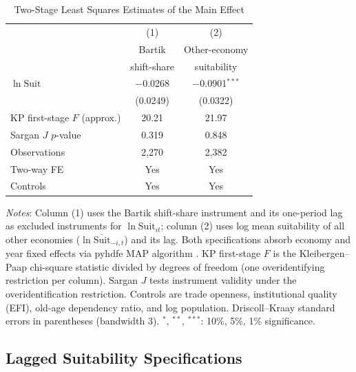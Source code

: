 \documentclass[12pt]{article}
\newcommand{\suit}{\mathrm{Suit}}
\begin{document}
\begin{table}[H]
\centering
\begin{threeparttable}
\caption{Two-Stage Least Squares Estimates of the Main Effect}
\label{tab:iv}
\small
\begin{tabular}{l*{2}{c}}
\toprule
 & (1) & (2) \\
 & Bartik & Other-economy \\
 & shift-share & suitability \\
\midrule
$\ln \suit$
  & $-$0.0268 & $-$0.0901$^{***}$ \\
  & (0.0249) & (0.0322) \\[4pt]
\midrule
KP first-stage $F$ (approx.)   & 20.21 & 21.97 \\
Sargan $J$ $p$-value           & 0.319 & 0.848 \\
Observations                   & 2,270 & 2,382 \\
Two-way FE                     & Yes & Yes \\
Controls                       & Yes & Yes \\
\bottomrule
\end{tabular}
\begin{tablenotes}
\footnotesize
\item \textit{Notes}: Column (1) uses the Bartik shift-share
instrument and its one-period lag as excluded instruments for
$\ln\suit_{it}$; column (2) uses log mean suitability of all
other economies ($\ln\overline{\suit}_{-i,t}$) and its lag.
Both specifications absorb economy and year fixed effects via
pyhdfe MAP algorithm \citep{li2026prosperity}.
KP first-stage $F$ is the Kleibergen--Paap chi-square statistic
divided by degrees of freedom (one overidentifying restriction
per column).
Sargan $J$ tests instrument validity under the overidentification
restriction.
Controls are trade openness, institutional quality (EFI),
old-age dependency ratio, and log population.
Driscoll--Kraay standard errors in parentheses (bandwidth 3).
$^{*}$, $^{**}$, $^{***}$: 10\%, 5\%, 1\% significance.
\end{tablenotes}
\end{threeparttable}
\end{table}

\subsection{Lagged Suitability Specifications}
\label{sec:lags}
\end{document}
